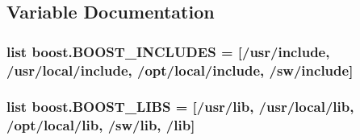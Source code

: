 \subsection{Variable Documentation}
\subsubsection[{\texorpdfstring{B\+O\+O\+S\+T\+\_\+\+I\+N\+C\+L\+U\+D\+ES}{BOOST_INCLUDES}}]{\setlength{\rightskip}{0pt plus 5cm}list boost.\+B\+O\+O\+S\+T\+\_\+\+I\+N\+C\+L\+U\+D\+ES = \mbox{[}\textquotesingle{}/usr/include\textquotesingle{}, \textquotesingle{}/usr/local/include\textquotesingle{}, \textquotesingle{}/opt/local/include\textquotesingle{}, \textquotesingle{}/sw/include\textquotesingle{}\mbox{]}}\hypertarget{namespaceboost_a26f05aa292f6e2e6c1573db673de53aa}{}\label{namespaceboost_a26f05aa292f6e2e6c1573db673de53aa}
\subsubsection[{\texorpdfstring{B\+O\+O\+S\+T\+\_\+\+L\+I\+BS}{BOOST_LIBS}}]{\setlength{\rightskip}{0pt plus 5cm}list boost.\+B\+O\+O\+S\+T\+\_\+\+L\+I\+BS = \mbox{[}\textquotesingle{}/usr/lib\textquotesingle{}, \textquotesingle{}/usr/local/lib\textquotesingle{}, \textquotesingle{}/opt/local/lib\textquotesingle{}, \textquotesingle{}/sw/lib\textquotesingle{}, \textquotesingle{}/lib\textquotesingle{}\mbox{]}}\hypertarget{namespaceboost_a6f024f093b10ce8e7c196238c31e6005}{}\label{namespaceboost_a6f024f093b10ce8e7c196238c31e6005}
